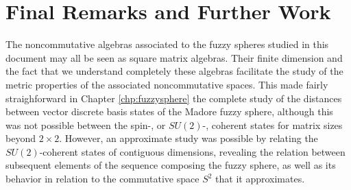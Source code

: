 \documentclass[12pt]{report}
\theoremstyle{definition}
\begin{document}
% 

\chapter{Final Remarks and Further Work}
 \label{chp:remarks}

The noncommutative algebras associated to the fuzzy spheres studied in this document may all be seen as square matrix algebras. Their finite dimension and the fact that we understand completely these algebras facilitate the study of the metric properties of the associated noncommutative spaces. This made fairly straighforward in Chapter \ref{chp:fuzzysphere} the complete study of the distances between vector discrete basis states of the Madore fuzzy sphere, although this was not possible between the spin-, or $SU(2)$-, coherent states for matrix sizes beyond $2 \times 2$. However, an approximate study was possible by relating the $SU(2)$-coherent states of contiguous dimensions, revealing the relation between subsequent elements of the sequence composing the fuzzy sphere, as well as its behavior in relation to the commutative space $S^2$ that it approximates. 
\end{document}
